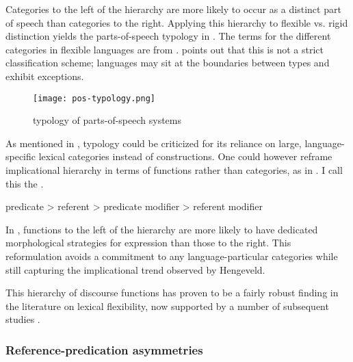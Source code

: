 \noindent Categories to the left of the hierarchy are more likely to occur as a distinct part of speech than categories to the right. Applying this hierarchy to  flexible vs. rigid distinction yields the parts-of-speech typology in  . The terms for the different categories in flexible languages are from \textcite{HengeveldRijkhoffSiewierska2004}. \citeauthor{Hengeveld1992} points out that this is not a strict classification scheme; languages may sit at the boundaries between types and exhibit exceptions.

\begin{figure}[h]
  \centering
  \texttt{[image: pos-typology.png]}
  \caption[Hengeveld's (1992) typology of parts-of-speech systems]{ \parencite*[69]{Hengeveld1992} typology of parts-of-speech systems}
  \label{fig:Hengeveld-pos-systems}
\end{figure}

As mentioned in ,  typology could be criticized for its reliance on large, language-specific lexical categories instead of constructions. One could however reframe  implicational hierarchy in terms of functions rather than categories, as in . I call this the .

\begin{exe}
  \ex\label{ex:2.9} predicate > referent > predicate modifier > referent modifier
\end{exe}

\noindent In , functions to the left of the hierarchy are more likely to have dedicated morphological strategies for expression than those to the right. This reformulation avoids a commitment to any language-particular categories while still capturing the implicational trend observed by Hengeveld.

This hierarchy of discourse functions has proven to be a fairly robust finding in the literature on lexical flexibility, now supported by a number of subsequent studies \parencites{Anward2000}{Rijkhoff2000}{Vogel2000}{Beck2002}{Rijkhoff2002}{Rijkhoff2003}{HengeveldRijkhoffSiewierska2004}{Lier2006}{Hengeveld2007}{HengeveldLier2012}{HengeveldValstar2010}{Beck2013}{Bisang2013}{Hengeveld2013}.

\subsubsection{Reference-predication asymmetries}
\label{sec:2.3.2.2}

